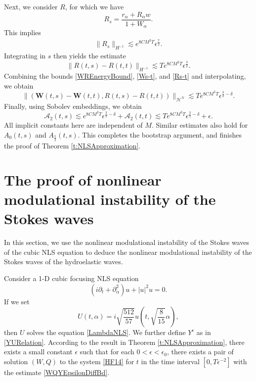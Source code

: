 \documentclass[12pt]{amsart}
\theoremstyle{remark}
\theoremstyle{definition}
\numberwithin{equation}{section}
\newcommand{\p}{\partial}
\newcommand{\e}{\epsilon}
\renewcommand{\H}{{\mathcal H }}
\newcommand{\al}{\alpha}
\newcommand{\f}{\frac}
\begin{document}
Next, we consider $R$, for which we have
\begin{equation*}
R_s=\f{r_{\al}+R_{\al}w}{1+W_{\al}}.
\end{equation*}
This implies
\begin{align*}
\|R_s\|_{H^{-1}}\lesssim e^{8CM^2T} \epsilon^{\frac{7}{2}}.
\end{align*}
Integrating in $s$ then yields the estimate
\begin{equation}\label{Rs-t}
\|R(t,s)-R(t,t)\|_{H^{-1}}\lesssim Te^{8CM^2T} \epsilon^{\frac{3}{2}}.
\end{equation}
Combining the bounds \eqref{WREnergyBound}, \eqref{Ws-t}, and \eqref{Rs-t} and interpolating, we obtain
\begin{equation*}
\|(\mathbf{W}(t,s)-\mathbf{W}(t,t),R(t,s)-R(t,t))\|_{\H^N} \lesssim Te^{8CM^2T} \epsilon^{\frac{3}{2}-\delta}.
\end{equation*}
Finally, using Sobolev embeddings, we obtain
\[\mathcal{A}_{2}(t,s)
\lesssim e^{8CM^2T} \epsilon^{\frac{3}{2}-\delta} + \mathcal{A}_{2}(t,t)\lesssim Te^{8CM^2T} \epsilon^{\frac{3}{2}-\delta} + \epsilon.
\]
All implicit constants here are independent of $M$. 
Similar estimates also hold for $A_0(t,s)$ and $A_{\f52}(t,s)$.
This completes the bootstrap argument, and finishes the proof of Theorem \ref{t:NLSApproximation}.


\section{The proof of nonlinear modulational instability of the Stokes waves} \label{s:Modulation}

In this section, we use the nonlinear modulational instability of the Stokes waves of the cubic NLS equation to deduce the nonlinear modulational instability of the Stokes waves of the hydroelastic waves.

Consider a 1-D cubic focusing NLS equation 
\begin{equation} \label{StandardCubicNLS}
    (i\p_t + \p_\al^2)u + |u|^2u = 0.
\end{equation}
If we set 
\begin{equation} \label{UuRelation}
U(t,\al)=i\sqrt{\f{512}{57}}u\left(t,\sqrt{\f{8}{15}}\al\right),   
\end{equation}
then $U$ solves the equation \eqref{LambdaNLS}.
We further define $Y^\e$ as in \eqref{YURelation}.
According to the result in Theorem \ref{t:NLSApproximation}, there exists a small constant $\e$ such that for each $0<\epsilon< \epsilon_0$, there exists a pair of solution $(W, Q)$ to the system \eqref{HF14} for $t$ in the time interval $[0, T\epsilon^{-2}]$ with the estimate \eqref{WQYEpsilonDiffBd}.
\end{document}
